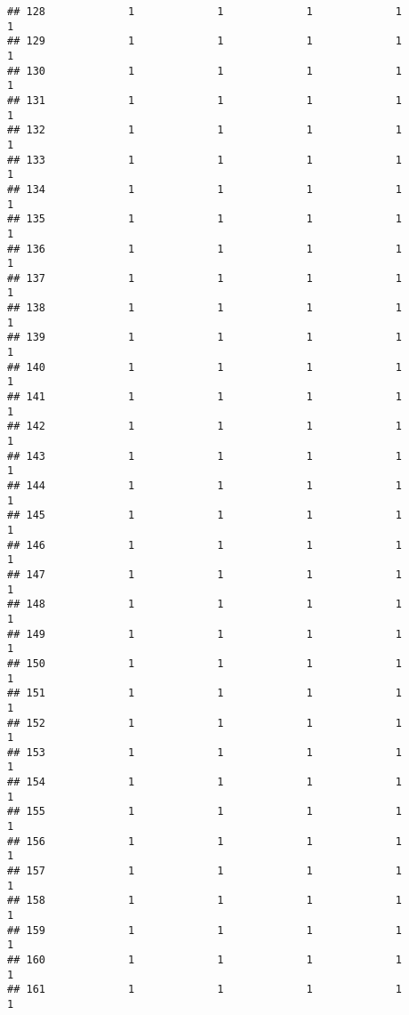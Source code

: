 \documentclass[
]{article}
\begin{document}
\begin{verbatim}
## 128             1             1             1             1             1
## 129             1             1             1             1             1
## 130             1             1             1             1             1
## 131             1             1             1             1             1
## 132             1             1             1             1             1
## 133             1             1             1             1             1
## 134             1             1             1             1             1
## 135             1             1             1             1             1
## 136             1             1             1             1             1
## 137             1             1             1             1             1
## 138             1             1             1             1             1
## 139             1             1             1             1             1
## 140             1             1             1             1             1
## 141             1             1             1             1             1
## 142             1             1             1             1             1
## 143             1             1             1             1             1
## 144             1             1             1             1             1
## 145             1             1             1             1             1
## 146             1             1             1             1             1
## 147             1             1             1             1             1
## 148             1             1             1             1             1
## 149             1             1             1             1             1
## 150             1             1             1             1             1
## 151             1             1             1             1             1
## 152             1             1             1             1             1
## 153             1             1             1             1             1
## 154             1             1             1             1             1
## 155             1             1             1             1             1
## 156             1             1             1             1             1
## 157             1             1             1             1             1
## 158             1             1             1             1             1
## 159             1             1             1             1             1
## 160             1             1             1             1             1
## 161             1             1             1             1             1

\end{verbatim}
\end{document}
